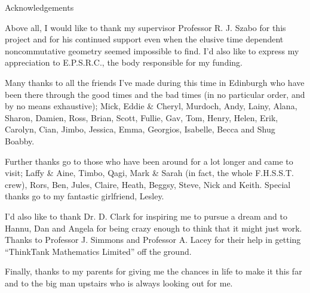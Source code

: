 {\Large Acknowledgements}

Above all, I would like to thank my supervisor Professor R. J. Szabo for this
project and for his continued support even when the elusive time dependent
noncommutative geometry seemed impossible to find. I'd also like to express my
appreciation to E.P.S.R.C., the body responsible for my funding.

Many thanks to all the friends I've made during this time in Edinburgh who have
been there through the good times and the bad times (in no particular order, and
by no means exhaustive); Mick, Eddie \& Cheryl, Murdoch, Andy, Lainy, Alana,
Sharon, Damien, Ross, Brian, Scott, Fullie, Gav, Tom, Henry, Helen, Erik,
Carolyn, Cian, Jimbo, Jessica, Emma, Georgios, Isabelle, Becca and Shug Boabby.

Further thanks go to those who have been around for a lot longer and came to
visit; Laffy \& Aine, Timbo, Qagi, Mark \& Sarah (in fact, the whole F.H.S.S.T.
crew), Rors, Ben, Jules, Claire, Heath, Beggsy, Steve, Nick and Keith. Special
thanks go to my fantastic girlfriend, Lesley.

I'd also like to thank Dr. D. Clark for inspiring me to pursue a dream and to
Hannu, Dan and Angela for being crazy enough to think that it might just work.
Thanks to Professor J. Simmons and Professor A. Lacey for their help in getting
``ThinkTank Mathematics Limited'' off the ground.

Finally, thanks to my parents for giving me the chances in life to make it this
far and to the big man upstairs who is always looking out for me.

